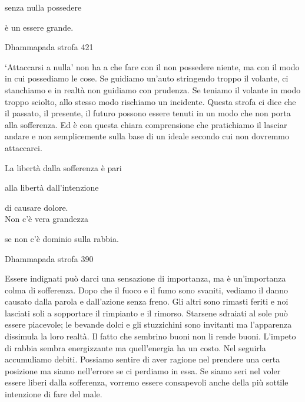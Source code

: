 \documentclass[a4paper,portrait,12pt]{article}
\begin{document}
senza nulla possedere	


\`{e} un essere grande.





Dhammapada strofa 421


\newpage



`Attaccarsi a nulla' non ha a che fare con il non possedere niente, ma con il modo in cui possediamo le cose. Se guidiamo un'auto stringendo troppo il volante, ci stanchiamo e in realt\`{a} non guidiamo con prudenza. Se teniamo il volante in modo troppo sciolto, allo stesso modo rischiamo un incidente. Questa strofa ci dice che il passato, il presente, il futuro possono essere tenuti in un modo che non porta alla sofferenza. Ed \`{e} con questa chiara comprensione che pratichiamo il lasciar andare e non semplicemente sulla base di un ideale secondo cui non dovremmo attaccarci. 


\newpage



La libert\`{a} dalla sofferenza \`{e} pari


alla libert\`{a} dall'intenzione


di causare dolore.\\Non c'\`{e} vera grandezza


se non c'\`{e} dominio sulla rabbia.





Dhammapada strofa 390


\newpage



Essere indignati pu\`{o} darci una sensazione di importanza, ma \`{e} un'importanza colma di sofferenza. Dopo che il fuoco e il fumo sono svaniti, vediamo il danno causato dalla parola e dall'azione senza freno. Gli altri sono rimasti feriti e noi lasciati soli a sopportare il rimpianto e il rimorso. Starsene sdraiati al sole pu\`{o} essere piacevole; le bevande dolci e gli stuzzichini sono invitanti ma l'apparenza dissimula la loro realt\`{a}. Il fatto che sembrino buoni non li rende buoni. L'impeto di rabbia sembra energizzante ma quell'energia ha un costo. Nel seguirla accumuliamo debiti. Possiamo sentire di aver ragione nel prendere una certa posizione ma siamo nell'errore se ci perdiamo in essa. Se siamo seri nel voler essere liberi dalla sofferenza, vorremo essere consapevoli anche della più sottile intenzione di fare del male.


\newpage
\end{document}

